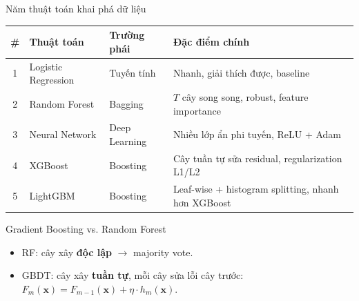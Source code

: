 \begin{frame}{Năm thuật toán khai phá dữ liệu}
\small
\begin{table}
\centering
\slideTablePad
\begin{tabular}{|c|l|l|p{5cm}|}
\hline
\textbf{\#} & \textbf{Thuật toán} & \textbf{Trường phái} & \textbf{Đặc điểm chính} \\
\hline
1 & Logistic Regression & Tuyến tính & Nhanh, giải thích được, baseline \\
\hline
2 & Random Forest & Bagging & $T$ cây song song, robust, feature importance \\
\hline
3 & Neural Network & Deep Learning & Nhiều lớp ẩn phi tuyến, ReLU + Adam \\
\hline
4 & XGBoost & Boosting & Cây tuần tự sửa residual, regularization L1/L2 \\
\hline
5 & LightGBM & Boosting & Leaf-wise + histogram splitting, nhanh hơn XGBoost \\
\hline
\end{tabular}
\end{table}

\vspace{2mm}
\begin{block}{Gradient Boosting vs. Random Forest}
\begin{itemize}
  \item RF: cây xây \textbf{độc lập} $\to$ majority vote.
  \item GBDT: cây xây \textbf{tuần tự}, mỗi cây sửa lỗi cây trước:
        $F_m(\mathbf{x}) = F_{m-1}(\mathbf{x}) + \eta \cdot h_m(\mathbf{x})$.
\end{itemize}
\end{block}
\end{frame}

